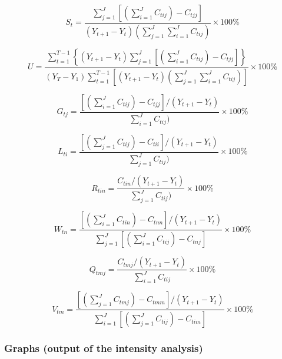 \begin{equation} \label{eq:st}
S_t = \frac{\sum_{j=1}^{J} \left[( \sum_{i=1}^{J} C_{tij}) - C_{tjj} \right]}{(Y_{t+1} - Y_{t})\left(\sum_{j=1}^{J} \sum_{i=1}^{J} C_{tij}\right)} \times 100\%
\end{equation}

\begin{equation} \label{eq:U}
U = \frac{\sum_{t=1}^{T-1} \left\{(Y_{t+1} - Y_t) \sum_{j=1}^{J} \left[\left(\sum_{i=1}^{J} C_{tij}\right) - C_{tjj}   \right]\right\}}{(Y_{T} - Y_{1}) \sum_{t=1}^{T-1} \left[(Y_{t+1} - Y_t) \left(\sum_{j=1}^{J} \sum_{i=1}^{J} C_{tij}\right)  \right]} \times 100\%
\end{equation}

\begin{equation} \label{eq:gtj}
G_{tj} = \frac{\left[\left( \sum_{i=1}^{J} C_{tij} \right) - C_{tjj}   \right] / (Y_{t+1} - Y_t)}{\sum_{i=1}^{J} C_{tij})} \times 100\%
\end{equation}

\begin{equation} \label{eq:lti}
L_{ti} = \frac{\left[\left( \sum_{j=1}^{J} C_{tij} \right) - C_{tii}   \right] / (Y_{t+1} - Y_t)}{\sum_{j=1}^{J} C_{tij})} \times 100\%
\end{equation}

\begin{equation} \label{eq:rtin}
R_{tin} = \frac{C_{tin} / (Y_{t+1} - Y_t)}{\sum_{j=1}^{J} C_{tij})} \times 100\%
\end{equation}

\begin{equation} \label{eq:wtn}
W_{tn} = \frac{\left[\left( \sum_{i=1}^{J} C_{tin} \right) - C_{tnn}   \right] / (Y_{t+1} - Y_t)}{\sum_{j=1}^{J}  \left[\left( \sum_{i=1}^{J} C_{tij} \right) - C_{tnj}   \right]} \times 100\%
\end{equation}

\begin{equation} \label{eq:qtmj}
Q_{tmj} = \frac{C_{tmj} / (Y_{t+1} - Y_t)}{\sum_{i=1}^{J} C_{tij}} \times 100\%
\end{equation}

\begin{equation} \label{eq:vtm}
V_{tm} = \frac{\left[\left( \sum_{j=1}^{J} C_{tmj} \right) - C_{tmm}   \right] / (Y_{t+1} - Y_t)}{\sum_{i=1}^{J}  \left[\left( \sum_{j=1}^{J} C_{tij} \right) - C_{tim}   \right]} \times 100\%
\end{equation}

\hypertarget{graphs-output-of-the-intensity-analysis}{%
\subsubsection{Graphs (output of the intensity
analysis)}\label{graphs-output-of-the-intensity-analysis}}


